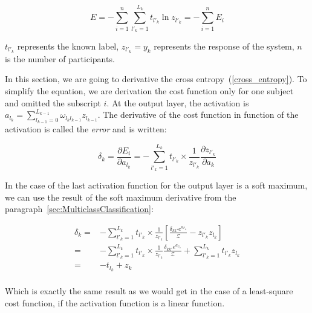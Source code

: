 \documentclass[final, paper=letter,5p,times,twocolumn]{elsarticle}
\begin{document}
\begin{equation}
  E = - \sum_{i = 1}^{n}\sum_{l'_{k} = 1}^{L_{k}} t_{l'_{k}} \ln z_{l'_{k}} =  - \sum_{i = 1}^{n} E_{i}
  \label{cross_entropy}
\end{equation}

$t_{l'_{k}}$ represents the known label, $z_{l'_{k}} = y_{k}$ represents the response of the system, $n$ is the number of participants. 

In this section, we are going to derivative the cross entropy~(\ref{cross_entropy}). To simplify the equation, we are derivation the cost function only for one subject and omitted the subscript $i$. At the output layer, the activation is $a_{l_{k}} = \sum_{l_{k-1} = 0}^{L_{k-1}} \omega_{l_{k}l_{k-1}} z_{l_{k-1}}$. The derivative of the cost function in function of the activation is called the {\it error} and is written:

\begin{equation}
  \delta_{k} = \frac{\partial E_{i}}{\partial a_{l_{k}}} = - \sum_{l'_{k} = 1}^{L_{k}} t_{l'_{k}} \times \frac{1}{z_{l'_{k}}} \frac{\partial z_{l'_{k}}}{\partial a_{k}}
  \label{cost_function_error}
\end{equation}

In the case of the last activation function for the output layer is a soft maximum, we can use the result of the soft maximum derivative from the paragraph~\ref{sec:MulticlassClassification}:

\begin{equation*}
  \begin{split}
    \delta_{k} = & - \sum_{l'_{k} = 1}^{L_{k}} t_{l'_{k}} \times \frac{1}{z_{l'_{k}}} \left \lbrack  \frac{\delta_{kk'} e^{a_{l'_{k}}}}{\mathcal{Z}} - z_{l'_{k}}z_{l_{k}} \right \rbrack \\
    = & - \sum_{l'_{k} = 1}^{L_{k}} t_{l'_{k}} \times \frac{1}{z_{l'_{k}}} \frac{\delta_{kk'} e^{a_{l'_{k}}}}{\mathcal{Z}} +  \sum_{l'_{k} = 1}^{L_{k}} t_{l'_{k}} z_{l_{k}} \\
    = & - t_{l_{k}} +  z_{k} \\
  \end{split}
\end{equation*}



Which is exactly the same result as we would get in the case of a least-square cost function, if the activation function is a linear function. 


\end{document}
